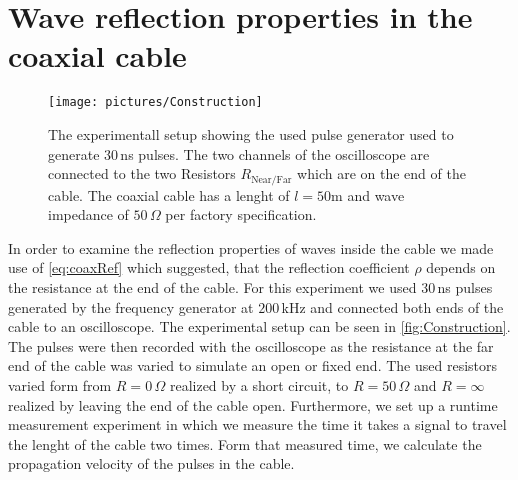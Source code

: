 \documentclass[a4paper,10pt,twocolumn]{article}
\begin{document}
    \section{Wave reflection properties in the coaxial cable}
    \label{sec:reflectionProperties}
    \begin{figure}[htbp]                                 %
        \begin{center}                                       %
            \texttt{[image: pictures/Construction]}      %
            \caption[]{The experimentall setup showing the used pulse generator used to generate $30\,$ns pulses. 
            The two channels of the oscilloscope are connected to the two Resistors $R_{\text{Near/Far}}$ which are on the end of the cable.
            The coaxial cable has a lenght of $l=50\text{m}$ and wave impedance of $50\,\Omega$ per factory specification.}   %
            \label{fig:Construction}                                      %
        \end{center}
    \end{figure}
    In order to examine the reflection properties of waves inside the cable we made use of \autoref{eq:coaxRef} which suggested, that the reflection
    coefficient $\rho$ depends on the resistance at the end of the cable.
    For this experiment we used $30\,$ns pulses generated by the frequency generator at $200\,$kHz and connected both ends of the cable to an oscilloscope.
    The experimental setup can be seen in \autoref{fig:Construction}.
    The pulses were then recorded with the oscilloscope as the resistance at the far end of the cable was varied to simulate an open or fixed end.
    The used resistors varied form from $R=0\,\Omega $ realized by a short circuit, to $R=50\,\Omega$ and $R=\infty$ realized by leaving the end of the cable open.
    Furthermore, we set up a runtime measurement experiment in which we measure the time it takes a signal to travel the lenght of the cable two times.
    Form that measured time, we calculate the propagation velocity of the pulses in the cable.
    
\end{document}
